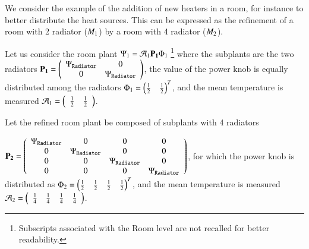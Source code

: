\documentclass[runningheads]{llncs}
\newcommand{\motif}[1][]{M\ifx#1\relax\else^{#1}\fi}
\newcommand{\profile}[1][]{\Phi\ifx#1\relax\else^{#1}\fi}
\newcommand{\aggregation}[1][]{\mathcal{A}\ifx#1\relax\else^{#1}\fi}
\newcommand{\plant}[1][]{\Psi\ifx#1\relax\else^{#1}\fi}
\newcommand{\subplant}[1][]{P\ifx#1\relax\else^{#1}\fi}
\newcommand{\predicatename}[1]{\mathtt{#1}}
\begin{document}

\begin{example}
We consider the example of the addition of new heaters in a room, for instance to better distribute the heat sources.
This can be expressed as the refinement of a room with 2 radiator ($\motif_1$) by a room with 4 radiator ($\motif_2$).

Let us consider the room plant $\plant_1 = \aggregation_1 \mathbf{\subplant_1} \profile_1 \ $\footnote{Subscripts associated with the Room level are not recalled for better readability.}
where the subplants are the two radiators 
$\mathbf{\subplant_1} = \left(\begin{array}{cc}
         \plant_\predicatename{Radiator} & 0 \\
         0 & \plant_\predicatename{Radiator}
    \end{array}\right)$,
the value of the power knob is equally distributed among the radiators
$\profile_1 = \left(\begin{array}{@{}ll@{}}
         \frac{1}{2} &
         \frac{1}{2}
    \end{array}\right)^T $,
and the mean temperature is measured 
$\aggregation_1 = \left(\begin{array}{cc}
         \frac{1}{2}  &          \frac{1}{2}
    \end{array}\right)$.

Let the refined room plant 
be composed of subplants with 4 radiators


$\mathbf{\subplant_2} = \left(\begin{array}{cccc}
         \plant_\predicatename{Radiator} & 0 & 0 & 0 \\
         0 & \plant_\predicatename{Radiator} & 0 & 0 \\
         0 & 0 & \plant_\predicatename{Radiator}  & 0 \\
         0 & 0 & 0 & \plant_\predicatename{Radiator} 
    \end{array}\right)$,
for which the power knob is distributed as %
$\profile_2 = \left(\begin{array}{@{}llll@{}}
         \frac{1}{2} &
         \frac{1}{2} &
         \frac{1}{2} &
         \frac{1}{2}         
    \end{array}\right)^T$,
and the mean temperature is measured 
$\aggregation_2 = \left(\begin{array}{cccc}
         \frac{1}{4}  &  \frac{1}{4}&  \frac{1}{4}&  \frac{1}{4}
    \end{array}\right)$.


\end{example}
\end{document}
